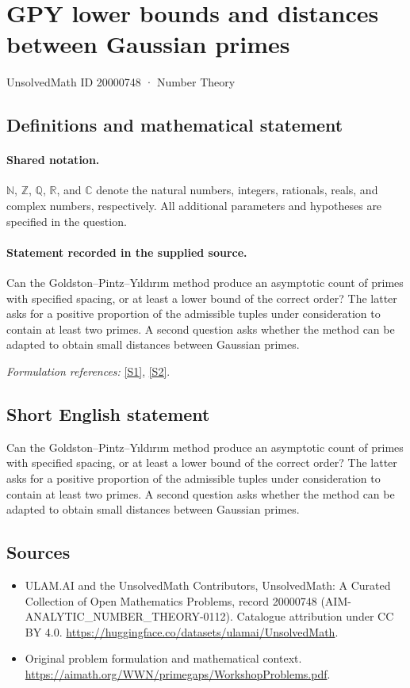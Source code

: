 \documentclass[11pt]{article}
\newcommand{\sref}[2]{\hyperlink{source:#1:#2}{[S#2]}}
\begin{document}
\setcounter{section}{20000747}
\section{GPY lower bounds and distances between Gaussian primes}\label{20000748}
{\small UnsolvedMath ID 20000748 · Number Theory}
\subsection{Definitions and mathematical statement}

\paragraph{Shared notation.}$\mathbb N$, $\mathbb Z$, $\mathbb Q$, $\mathbb R$, and $\mathbb C$ denote the natural numbers, integers, rationals, reals, and complex numbers, respectively. All additional parameters and hypotheses are specified in the question.


\paragraph{Statement recorded in the supplied source.}
Can the Goldston--Pintz--Y\i ld\i r\i m method produce an asymptotic count of primes with specified spacing, or at least a lower bound of the correct order? The latter asks for a positive proportion of the admissible tuples under consideration to contain at least two primes. A second question asks whether the method can be adapted to obtain small distances between Gaussian primes.
\par\smallskip\textit{Formulation references:} \sref{20000748}{1}, \sref{20000748}{2}.
\subsection{Short English statement}
Can the Goldston--Pintz--Y\i ld\i r\i m method produce an asymptotic count of primes with specified spacing, or at least a lower bound of the correct order? The latter asks for a positive proportion of the admissible tuples under consideration to contain at least two primes. A second question asks whether the method can be adapted to obtain small distances between Gaussian primes.
\subsection{Sources}
\begin{itemize}
\item[\hypertarget{source:20000748:1}{S1}] ULAM.AI and the UnsolvedMath Contributors, UnsolvedMath: A Curated Collection of Open Mathematics Problems, record 20000748 (AIM-ANALYTIC\_NUMBER\_THEORY-0112). Catalogue attribution under CC BY 4.0.
\url{https://huggingface.co/datasets/ulamai/UnsolvedMath}.
\item[\hypertarget{source:20000748:2}{S2}] Original problem formulation and mathematical context.
\url{https://aimath.org/WWN/primegaps/WorkshopProblems.pdf}.
\end{itemize}
\label{end:20000748}
\end{document}
